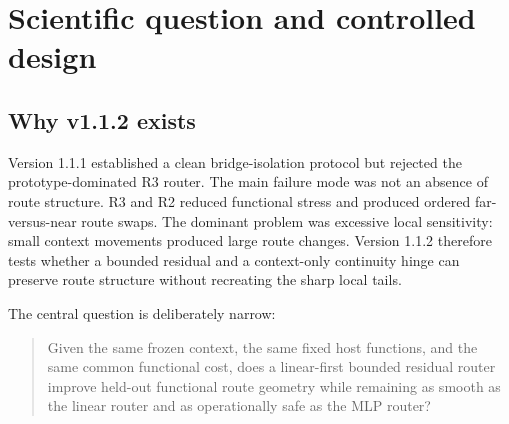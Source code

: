 \documentclass[11pt,a4paper]{article}
\begin{document}
\section{Scientific question and controlled design}
\subsection{Why v1.1.2 exists}
Version 1.1.1 established a clean bridge-isolation protocol but rejected the prototype-dominated R3 router. The main failure mode was not an absence of route structure. R3 and R2 reduced functional stress and produced ordered far-versus-near route swaps. The dominant problem was excessive local sensitivity: small context movements produced large route changes. Version 1.1.2 therefore tests whether a bounded residual and a context-only continuity hinge can preserve route structure without recreating the sharp local tails.

The central question is deliberately narrow:
\begin{quote}
Given the same frozen context, the same fixed host functions, and the same common functional cost, does a linear-first bounded residual router improve held-out functional route geometry while remaining as smooth as the linear router and as operationally safe as the MLP router?
\end{quote}
\end{document}
